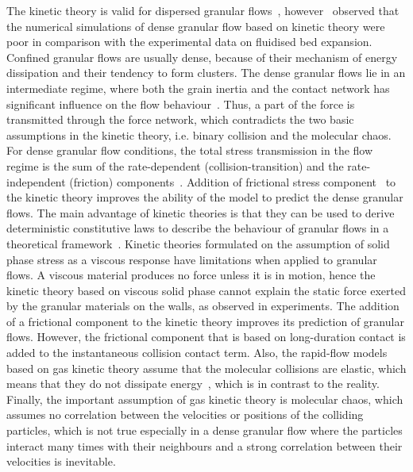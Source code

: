 The kinetic theory is valid for dispersed granular flows~\citep{Ng2008}, 
however~\citet{VanWachem2001} observed that the numerical simulations of dense 
granular flow based on kinetic theory were poor in comparison with the 
experimental data on fluidised bed expansion. Confined granular flows are 
usually dense, because of their mechanism of energy dissipation and their 
tendency to form clusters. The dense granular flows lie in an intermediate 
regime, where both the grain inertia and the contact network has significant 
influence on the flow behaviour~\citep{Pouliquen2002}. Thus, a part of the 
force is transmitted through the force network, which contradicts the two basic 
assumptions in the kinetic theory, i.e. binary collision and the molecular 
chaos. 
For dense granular flow conditions, the total stress transmission in the flow 
regime is the sum of the rate-dependent (collision-transition) and the 
rate-independent (friction) components~\citep{Ng2008}. Addition of frictional 
stress component~\citep{Schaeffer1987} to the kinetic theory improves the 
ability of the model to predict the dense granular flows. The main advantage of 
kinetic theories is that they can be used to derive deterministic constitutive 
laws to describe the behaviour of granular flows in a theoretical 
framework~\citep{Jenkins1983}. Kinetic theories formulated on the assumption of 
solid phase stress as a viscous response have limitations when applied to 
granular flows. A viscous material produces no force unless it is in motion, 
hence the kinetic theory based on viscous solid phase cannot explain the static 
force exerted by the granular materials on the walls, as observed in 
experiments. The addition of a frictional component to the kinetic theory 
improves its prediction of granular flows. However, the frictional component 
that is based on long-duration contact is added to the instantaneous collision 
contact term. Also, the rapid-flow models based on gas kinetic theory assume 
that the molecular collisions are elastic, which means that they do not 
dissipate energy~\citep{Campbell2006}, which is in contrast to the reality. 
Finally, the important assumption of gas kinetic theory is molecular chaos, 
which assumes no correlation between the velocities or positions of the 
colliding particles, which is not true especially in a dense granular flow 
where the particles interact many times with their neighbours and a strong 
correlation between their velocities is inevitable.

